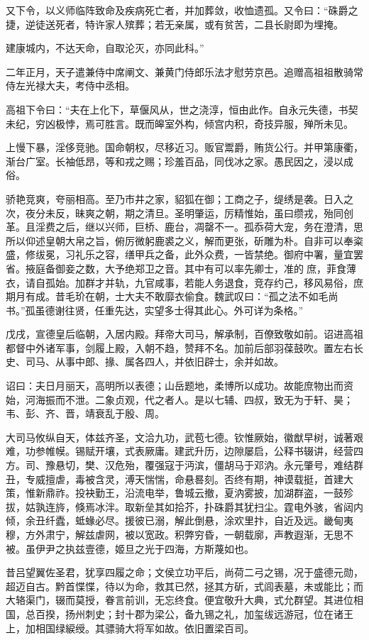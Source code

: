 \documentclass[12pt,UTF8]{ctexbook}
\begin{document}
又下令，以义师临阵致命及疾病死亡者，并加葬敛，收恤遗孤。又令曰：“硃爵之捷，逆徒送死者，特许家人殡葬；若无亲属，或有贫苦，二县长尉即为埋掩。

建康城内，不达天命，自取沦灭，亦同此科。”

二年正月，天子遣兼侍中席阐文、兼黄门侍郎乐法才慰劳京邑。追赠高祖祖散骑常侍左光禄大夫，考侍中丞相。

高祖下令曰：“夫在上化下，草偃风从，世之浇淳，恒由此作。自永元失德，书契未纪，穷凶极悖，焉可胜言。既而皞室外构，倾宫内积，奇技异服，殚所未见。

上慢下暴，淫侈竞驰。国命朝权，尽移近习。贩官鬻爵，贿货公行。并甲第康衢，渐台广室。长袖低昂，等和戎之赐；珍羞百品，同伐冰之家。愚民因之，浸以成俗。

骄艳竞爽，夸丽相高。至乃市井之家，貂狐在御；工商之子，缇绣是袭。日入之次，夜分未反，昧爽之朝，期之清旦。圣明肇运，厉精惟始，虽曰缵戎，殆同创革。且淫费之后，继以兴师，巨桥、鹿台，凋罄不一。孤忝荷大宠，务在澄清，思所以仰述皇朝大帛之旨，俯厉微躬鹿裘之义，解而更张，斫雕为朴。自非可以奉粢盛，修绂冕，习礼乐之容，缮甲兵之备，此外众费，一皆禁绝。御府中署，量宜罢省。掖庭备御妾之数，大予绝郑卫之音。其中有可以率先卿士，准的庶，菲食薄衣，请自孤始。加群才并轨，九官咸事，若能人务退食，竞存约己，移风易俗，庶期月有成。昔毛玠在朝，士大夫不敢靡衣偷食。魏武叹曰：“孤之法不如毛尚书。”孤虽德谢往贤，任重先达，实望多士得其此心。外可详为条格。”

戊戌，宣德皇后临朝，入居内殿。拜帝大司马，解承制，百僚致敬如前。诏进高祖都督中外诸军事，剑履上殿，入朝不趋，赞拜不名。加前后部羽葆鼓吹。置左右长史、司马、从事中郎、掾、属各四人，并依旧辟士，余并如故。

诏曰：夫日月丽天，高明所以表德；山岳题地，柔博所以成功。故能庶物出而资始，河海振而不泄。二象贞观，代之者人。是以七辅、四叔，致无为于轩、昊；韦、彭、齐、晋，靖衰乱于殷、周。

大司马攸纵自天，体兹齐圣，文洽九功，武苞七德。钦惟厥始，徽猷早树，诚著艰难，功参帷幙。锡赋开壤，式表厥庸。建武升历，边隙屡启，公释书辍讲，经营四方。司、豫悬切，樊、汉危殆，覆强寇于沔滨，僵胡马于邓汭。永元肇号，难结群丑，专威擅虐，毒被含灵，溥天惴惴，命悬晷刻。否终有期，神谟载挺，首建大策，惟新鼎祚。投袂勤王，沿流电举，鲁城云撤，夏汭雾披，加湖群盗，一鼓殄拔，姑孰连旍，倏焉冰泮。取新垒其如拾芥，扑硃爵其犹扫尘。霆电外骇，省闼内倾，余丑纤蠹，蚳蝝必尽。援彼已溺，解此倒悬，涂欢里抃，自近及远。畿甸夷穆，方外肃宁，解兹虐网，被以宽政。积弊穷昏，一朝载廓，声教遐渐，无思不被。虽伊尹之执兹壹德，姬旦之光于四海，方斯蔑如也。

昔吕望翼佐圣君，犹享四履之命；文侯立功平后，尚荷二弓之锡，况于盛德元勋，超迈自古。黔首惵惵，待以为命，救其已然，拯其方斫，式闾表墓，未或能比；而大辂渠门，辍而莫授，眷言前训，无忘终食。便宜敬升大典，式允群望。其进位相国，总百揆，扬州刺史；封十郡为梁公，备九锡之礼，加玺绂远游冠，位在诸王上，加相国绿綟绶。其骠骑大将军如故。依旧置梁百司。
\end{document}
